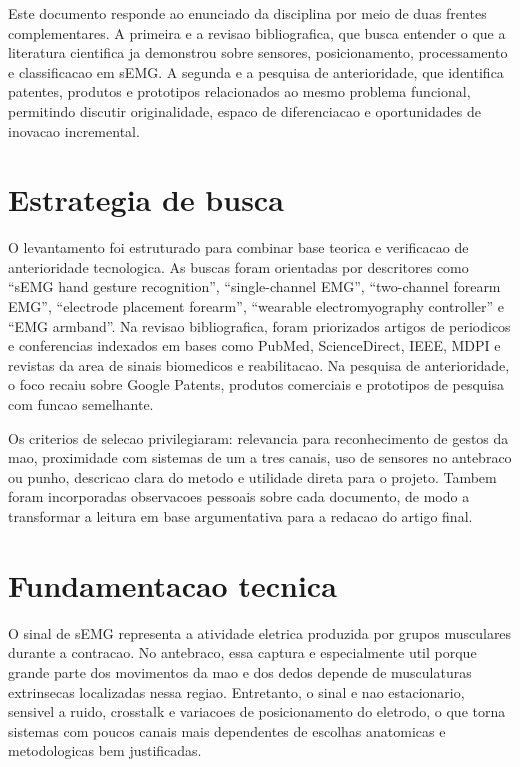 \documentclass[12pt,oneside,a4paper,english,brazilian]{abntex2}
\begin{document}
Este documento responde ao enunciado da disciplina por meio de duas frentes complementares. A primeira e a revisao bibliografica, que busca entender o que a literatura cientifica ja demonstrou sobre sensores, posicionamento, processamento e classificacao em sEMG. A segunda e a pesquisa de anterioridade, que identifica patentes, produtos e prototipos relacionados ao mesmo problema funcional, permitindo discutir originalidade, espaco de diferenciacao e oportunidades de inovacao incremental.

\section{Estrategia de busca}

O levantamento foi estruturado para combinar base teorica e verificacao de anterioridade tecnologica. As buscas foram orientadas por descritores como ``sEMG hand gesture recognition'', ``single-channel EMG'', ``two-channel forearm EMG'', ``electrode placement forearm'', ``wearable electromyography controller'' e ``EMG armband''. Na revisao bibliografica, foram priorizados artigos de periodicos e conferencias indexados em bases como PubMed, ScienceDirect, IEEE, MDPI e revistas da area de sinais biomedicos e reabilitacao. Na pesquisa de anterioridade, o foco recaiu sobre Google Patents, produtos comerciais e prototipos de pesquisa com funcao semelhante.

Os criterios de selecao privilegiaram: relevancia para reconhecimento de gestos da mao, proximidade com sistemas de um a tres canais, uso de sensores no antebraco ou punho, descricao clara do metodo e utilidade direta para o projeto. Tambem foram incorporadas observacoes pessoais sobre cada documento, de modo a transformar a leitura em base argumentativa para a redacao do artigo final.

\section{Fundamentacao tecnica}

O sinal de sEMG representa a atividade eletrica produzida por grupos musculares durante a contracao. No antebraco, essa captura e especialmente util porque grande parte dos movimentos da mao e dos dedos depende de musculaturas extrinsecas localizadas nessa regiao. Entretanto, o sinal e nao estacionario, sensivel a ruido, crosstalk e variacoes de posicionamento do eletrodo, o que torna sistemas com poucos canais mais dependentes de escolhas anatomicas e metodologicas bem justificadas.
\end{document}
